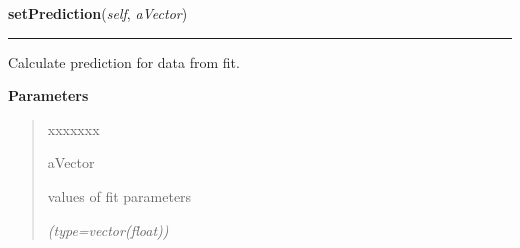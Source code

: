     \label{gblfit:GblData:setPrediction}

    \vspace{0.5ex}

\hspace{.8\funcindent}\begin{boxedminipage}{\funcwidth}

    \raggedright \textbf{setPrediction}(\textit{self}, \textit{aVector})

    \vspace{-1.5ex}

    \rule{\textwidth}{0.5\fboxrule}
\setlength{\parskip}{2ex}
    Calculate prediction for data from fit.

\setlength{\parskip}{1ex}
      \textbf{Parameters}
      \vspace{-1ex}

      \begin{quote}
        \begin{Ventry}{xxxxxxx}

          \item[aVector]

          values of fit parameters

            {\it (type=vector(float))}

        \end{Ventry}

      \end{quote}

    \end{boxedminipage}

    \label{gblfit:GblData:setDownWeighting}

    \vspace{0.5ex}

